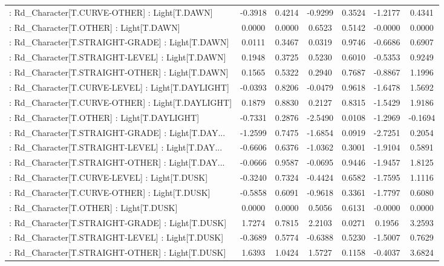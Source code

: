 \begin{longtable}{p{4cm}cccccc}
 : Rd\_Character[T.CURVE-OTHER] : Light[T.DAWN]     & -0.3918 &    0.4214 & -0.9299 &       0.3524 & -1.2177 &  0.4341 \\
 : Rd\_Character[T.OTHER] : Light[T.DAWN]           &  0.0000 &    0.0000 &  0.6523 &       0.5142 & -0.0000 &  0.0000 \\
 : Rd\_Character[T.STRAIGHT-GRADE] : Light[T.DAWN]  &  0.0111 &    0.3467 &  0.0319 &       0.9746 & -0.6686 &  0.6907 \\
 : Rd\_Character[T.STRAIGHT-LEVEL] : Light[T.DAWN]  &  0.1948 &    0.3725 &  0.5230 &       0.6010 & -0.5353 &  0.9249 \\
 : Rd\_Character[T.STRAIGHT-OTHER] : Light[T.DAWN]  &  0.1565 &    0.5322 &  0.2940 &       0.7687 & -0.8867 &  1.1996 \\
 : Rd\_Character[T.CURVE-LEVEL] : Light[T.DAYLIGHT] & -0.0393 &    0.8206 & -0.0479 &       0.9618 & -1.6478 &  1.5692 \\
 : Rd\_Character[T.CURVE-OTHER] : Light[T.DAYLIGHT] &  0.1879 &    0.8830 &  0.2127 &       0.8315 & -1.5429 &  1.9186 \\
 : Rd\_Character[T.OTHER] : Light[T.DAYLIGHT]       & -0.7331 &    0.2876 & -2.5490 &       0.0108 & -1.2969 & -0.1694 \\
 : Rd\_Character[T.STRAIGHT-GRADE] : Light[T.DAY... & -1.2599 &    0.7475 & -1.6854 &       0.0919 & -2.7251 &  0.2054 \\
 : Rd\_Character[T.STRAIGHT-LEVEL] : Light[T.DAY... & -0.6606 &    0.6376 & -1.0362 &       0.3001 & -1.9104 &  0.5891 \\
 : Rd\_Character[T.STRAIGHT-OTHER] : Light[T.DAY... & -0.0666 &    0.9587 & -0.0695 &       0.9446 & -1.9457 &  1.8125 \\
 : Rd\_Character[T.CURVE-LEVEL] : Light[T.DUSK]     & -0.3240 &    0.7324 & -0.4424 &       0.6582 & -1.7595 &  1.1116 \\
 : Rd\_Character[T.CURVE-OTHER] : Light[T.DUSK]     & -0.5858 &    0.6091 & -0.9618 &       0.3361 & -1.7797 &  0.6080 \\
 : Rd\_Character[T.OTHER] : Light[T.DUSK]           &  0.0000 &    0.0000 &  0.5056 &       0.6131 & -0.0000 &  0.0000 \\
 : Rd\_Character[T.STRAIGHT-GRADE] : Light[T.DUSK]  &  1.7274 &    0.7815 &  2.2103 &       0.0271 &  0.1956 &  3.2593 \\
 : Rd\_Character[T.STRAIGHT-LEVEL] : Light[T.DUSK]  & -0.3689 &    0.5774 & -0.6388 &       0.5230 & -1.5007 &  0.7629 \\
 : Rd\_Character[T.STRAIGHT-OTHER] : Light[T.DUSK]  &  1.6393 &    1.0424 &  1.5727 &       0.1158 & -0.4037 &  3.6824 \\

\end{longtable}
